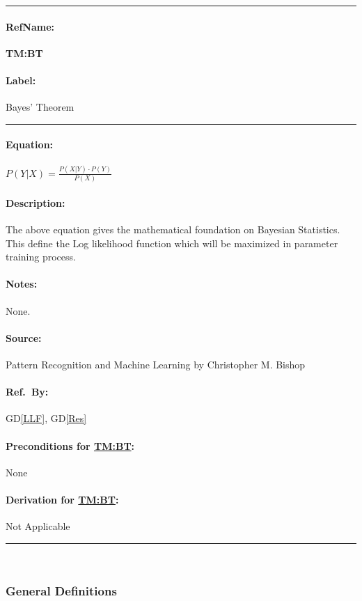 \documentclass[12pt]{article}
\newcommand{\dref}[1]{GD\ref{#1}}
\newcommand{\deftheory}[9][Not Applicable]
{
\newpage
\noindent \rule{\textwidth}{0.5mm}

\paragraph{RefName: } \textbf{#2} \phantomsection 
\label{#2}

\paragraph{Label:} #3

\noindent \rule{\textwidth}{0.5mm}

\paragraph{Equation:}

#4

\paragraph{Description:}

#5

\paragraph{Notes:}

#6

\paragraph{Source:}

#7

\paragraph{Ref.\ By:}

#8

\paragraph{Preconditions for \hyperref[#2]{#2}:}
\label{#2_precond}

#9

\paragraph{Derivation for \hyperref[#2]{#2}:}
\label{#2_deriv}

#1

\noindent \rule{\textwidth}{0.5mm}

}
\begin{document}
\deftheory
{TM:BT}
{Bayes' Theorem }
{
  $P(Y | X) = \frac{P(X | Y) \cdot P(Y)}{P(X)}$ 
}
{
  The above equation gives the mathematical foundation on Bayesian Statistics. This define the Log likelihood function which will be maximized in parameter training process. 
}
{
None.
}
{
  Pattern Recognition and Machine Learning by Christopher M. Bishop
}
{
  \dref{LLF}, \dref{Res}
}
{
None
}
{}

~\newline

\subsubsection{General Definitions}\label{sec_gendef}


\\
~\newline
\end{document}
